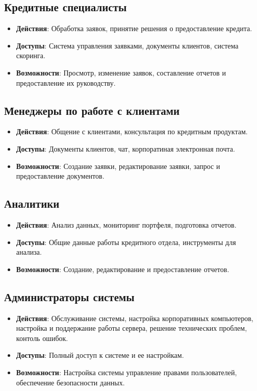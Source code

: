 \documentclass[20pt]{article}
\begin{document}
\subsection{Кредитные специалисты}
\begin{itemize}
    \item \textbf{Действия}: Обработка заявок, принятие решения о предоставление кредита.
    \item \textbf{Доступы}: Система управления заявками, документы клиентов, система скоринга.
    \item \textbf{Возможности}: Просмотр, изменение заявок, составление отчетов и предоставление их руководству.
\end{itemize}

\subsection{Менеджеры по работе с клиентами}
\begin{itemize}
    \item \textbf{Действия}: Общение с клиентами, консультация по кредитным продуктам.
    \item \textbf{Доступы}: Документы клиентов, чат, корпоратиная электронная почта.
    \item \textbf{Возможности}: Создание заявки, редактирование заявки, запрос и предоставление документов.
\end{itemize}

\subsection{Аналитики}
\begin{itemize}
    \item \textbf{Действия}: Анализ данных, мониторинг портфеля, подготовка отчетов.
    \item \textbf{Доступы}: Общие данные работы кредитного отдела, инструменты для анализа.
    \item \textbf{Возможности}: Создание, редактирование и предоставление отчетов.
\end{itemize}

\subsection{Администраторы системы}
\begin{itemize}
    \item \textbf{Действия}: Обслуживание системы, настройка корпоративных компьютеров, настройка и поддержание работы сервера, решение технических проблем, контоль ошибок.
    \item \textbf{Доступы}: Полный доступ к системе и ее настройкам.
    \item \textbf{Возможности}: Настройка системы управление правами пользователей, обеспечение безопасности данных.
\end{itemize}
\end{document}
